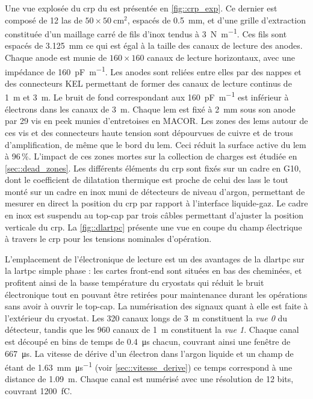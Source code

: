       Une vue explosée du \gls{crp} du \TOO{} est présentée en \autoref{fig::crp_exp}. Ce dernier est composé de 12 \gls{las} de $50\times\SI{50}{\centi\meter\squared}$,  espacés de \SI{0.5}{\milli\meter}, et d'une grille d'extraction constituée d'un maillage carré de fils d'inox tendus à \SI{3}{\newton\per\meter}. Ces fils sont espacés de \SI{3.125}{\milli\meter} ce qui est égal à la taille des canaux de lecture des anodes. Chaque anode est munie de $160\times160$ canaux de lecture horizontaux, avec une impédance de \SI{160}{\pico\farad\per\meter}. Les anodes sont reliées entre elles par des nappes et des connecteurs KEL permettant de former des canaux de lecture continus de \SI{1}{\meter} et \SI{3}{\meter}. Le bruit de fond correspondant aux \SI{160}{\pico\farad\per\meter} est inférieur à  électrons dans les canaux de \SI{3}{\meter}\cite{Aimard2018}. Chaque \gls{lem} est fixé à \SI{2}{\milli\meter} sous son anode par 29 vis en \gls{peek} munies d'entretoises en MACOR. Les zones des \glspl{lem} autour de ces vis et des connecteurs haute tension sont dépourvues de cuivre et de trous d'amplification, de même que le bord du \gls{lem}. Ceci réduit la surface active du \gls{lem} à 96\,\%. L'impact de ces zones mortes sur la collection de charges est étudiée en \autoref{sec::dead_zones}. Les différents éléments du \gls{crp} sont fixés sur un cadre en G10, dont le coefficient de dilatation thermique est proche de celui des \glspl{las} le tout monté sur un cadre en inox muni de détecteurs de niveau d'argon, permettant de mesurer en direct la position du \gls{crp} par rapport à l'interface liquide-gaz. Le cadre en inox est suspendu au top-cap par trois câbles permettant d'ajuster la position verticale du \gls{crp}. La \autoref{fig::dlartpc} présente une vue en coupe du champ électrique à travers le \gls{crp} pour les tensions nominales d'opération.

      L'emplacement de l'électronique de lecture est un des avantages de la \gls{dlartpc} sur la \gls{lartpc} simple phase : les cartes front-end sont situées en bas des cheminées, et profitent ainsi de la basse température du cryostats qui réduit le bruit électronique tout en pouvant être retirées pour maintenance durant les opérations sans avoir à ouvrir le top-cap. La numérisation des signaux quant à elle est faite à l'extérieur du cryostat. Les 320 canaux longs de \SI{3}{\meter} constituent la \textit{vue 0} du détecteur, tandis que les 960 canaux de \SI{1}{\meter} constituent la \textit{vue 1}. Chaque canal est découpé en  bins de temps de \SI{0.4}{\micro\second} chacun, couvrant ainsi une fenêtre de \SI{667}{\micro\second}. La vitesse de dérive d'un électron dans l'argon liquide et un champ de \driftfield{} étant de \SI{1.63}{\milli\meter\per\micro\second} (voir \autoref{sec::vitesse_derive}) ce temps correspond à une distance de \SI{1.09}{\meter}. Chaque canal est numérisé avec une résolution de 12 bits, couvrant \SI{1200}{\femto\coulomb}.

